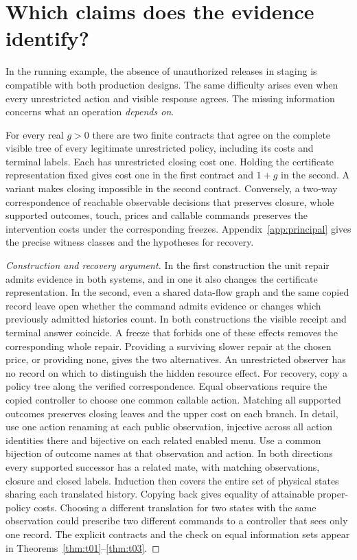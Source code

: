 \section{Which claims does the evidence identify?}\label{sec:id}
In the running example, the absence of unauthorized releases in staging is compatible with both production designs. The same difficulty arises even when every unrestricted action and visible response agrees. The missing information concerns what an operation \emph{depends on}.

\begin{theorem}
For every real \(g>0\) there are two finite contracts that agree on the complete visible tree of every legitimate unrestricted policy, including its costs and terminal labels. Each has unrestricted closing cost one. Holding the certificate representation fixed gives cost one in the first contract and \(1+g\) in the second. A variant makes closing impossible in the second contract. Conversely, a two-way correspondence of reachable observable decisions that preserves closure, whole supported outcomes, touch, prices and callable commands preserves the intervention costs under the corresponding freezes. Appendix~\ref{app:principal} gives the precise witness classes and the hypotheses for recovery.
\end{theorem}
\begin{proof}[Construction and recovery argument]
In the first construction the unit repair admits evidence in both systems, and in one it also changes the certificate representation. In the second, even a shared data-flow graph and the same copied record leave open whether the command admits evidence or changes which previously admitted histories count. In both constructions the visible receipt and terminal answer coincide. A freeze that forbids one of these effects removes the corresponding whole repair. Providing a surviving slower repair at the chosen price, or providing none, gives the two alternatives. An unrestricted observer has no record on which to distinguish the hidden resource effect. For recovery, copy a policy tree along the verified correspondence. Equal observations require the copied controller to choose one common callable action. Matching all supported outcomes preserves closing leaves and the upper cost on each branch. In detail, use one action renaming at each public observation, injective across all action identities there and bijective on each related enabled menu. Use a common bijection of outcome names at that observation and action. In both directions every supported successor has a related mate, with matching observations, closure and closed labels. Induction then covers the entire set of physical states sharing each translated history. Copying back gives equality of attainable proper-policy costs. Choosing a different translation for two states with the same observation could prescribe two different commands to a controller that sees only one record. The explicit contracts and the check on equal information sets appear in Theorems~\ref{thm:t01}--\ref{thm:t03}.
\end{proof}
